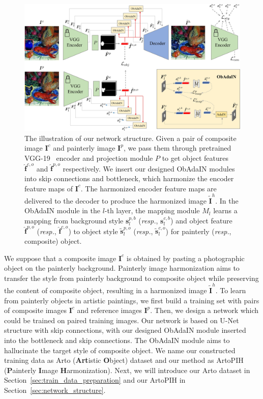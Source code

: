 \documentclass[letterpaper]{article} %
\begin{document}
\begin{figure}[t]
\centering
\includegraphics[width=0.85\linewidth]{figures/network_new.jpg}
\caption{The illustration of our network structure. Given a pair of composite image $\bm{I}^c$ and painterly image $\bm{I}^p$, we pass them through pretrained VGG-19~\cite{VGG19} encoder and projection module $P$ to get object features $\hat{\bm{f}}^{c,o}$ and $\hat{\bm{f}}^{p,o}$ respectively. We insert our designed ObAdaIN modules into skip connections and bottleneck, which harmonize the encoder feature maps of $\bm{I}^c$. The harmonized encoder feature maps are delivered to the decoder to produce the harmonized image $\tilde{\bm{I}}^h$. In the ObAdaIN module in the $l$-th layer, the mapping module $M_l$ learns a mapping from background style $\bm{s}_l^{p,b}$ (\emph{resp.}, $\bm{s}_l^{c,b}$) and object feature $\hat{\bm{f}}^{p,o}$ (\emph{resp.}, $\hat{\bm{f}}^{c,o}$) to object style $\tilde{\bm{s}}_l^{p,o}$  (\emph{resp.}, $\tilde{\bm{s}}_l^{c,o}$) for painterly (\emph{resp.}, composite) object. }
\label{fig:network}
\end{figure}

We suppose that a composite image $\bm{I}^c$ is obtained by pasting a photographic object on the painterly background.  Painterly image harmonization aims to transfer the style from painterly background to composite object while preserving the content of composite object, resulting in a harmonized image $\tilde{\bm{I}}^h$. To learn from painterly objects in artistic paintings, we first build a training set with pairs of composite images $\bm{I}^c$ and reference images $\bm{I}^p$.
Then, we design a network which could be trained on paired training images. Our network is based on U-Net  \cite{ronneberger2015u} structure with skip connections, with our designed ObAdaIN module inserted into the bottleneck and skip connections. The ObAdaIN module aims to hallucinate the target style of composite object.
We name our constructed training data as Arto (\textbf{Art}istic \textbf{O}bject) dataset and our method as ArtoPIH (\textbf{P}ainterly \textbf{I}mage \textbf{H}armonization).
Next, we will introduce our Arto dataset in Section~\ref{sec:train_data_preparation} and our ArtoPIH in Section~\ref{sec:network_structure}.
\end{document}
